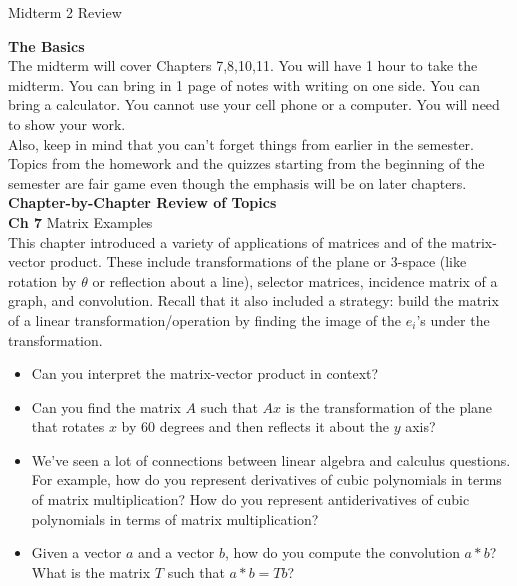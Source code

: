 \documentclass[11pt,fleqn]{article}
\begin{document}
\begin{center}{\Large{Midterm 2 Review}}\end{center}


\noindent\textbf{The Basics}\\

The midterm will cover Chapters 7,8,10,11. You will have 1 hour to take the midterm. You can bring in 1 page of notes with writing on one side. You can bring a calculator. You cannot use your cell phone or a computer. You will need to show your work.\\

Also, keep in mind that you can't forget things from earlier in the semester. Topics from the homework and the quizzes starting from the beginning of the semester are fair game even though the emphasis will be on later chapters.\\

\noindent\textbf{Chapter-by-Chapter Review of Topics}\\

\noindent\textbf{Ch 7} Matrix Examples\\

This chapter introduced a variety of applications of matrices and of the matrix-vector product. These include transformations of the plane or 3-space (like rotation by $\theta$ or reflection about a line), selector matrices, incidence matrix of a graph, and convolution. Recall that it also included a strategy: build the matrix of a linear transformation/operation by finding the image of the $e_i$'s under the transformation.\\

\begin{itemize}
	\item Can you interpret the matrix-vector product in context?
	\item Can you find the matrix $A$ such that $Ax$  is the transformation of the plane that rotates $x$ by 60 degrees and then reflects it about the $y$ axis?
	\item We've seen a lot of connections between linear algebra and calculus questions.
For example, how do you represent derivatives of cubic polynomials in terms 
of matrix multiplication?  How do you represent
antiderivatives of cubic polynomials in terms of matrix multiplication?
	\item Given a vector $a$ and a vector $b$, how do you compute the convolution $a*b$?
What is the matrix $T$ such that $a*b = Tb$?
\end{itemize}
\end{document}
